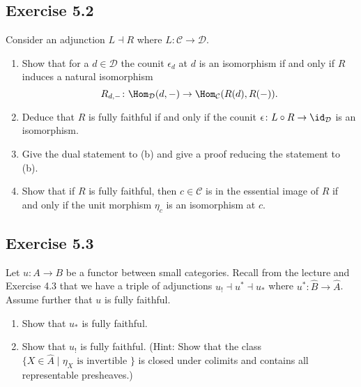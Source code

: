 \subsection{ Exercise 5.2}

Consider an adjunction $ L \dashv R $ where $ L \colon \mathcal{ C } \to \mathcal{ D } $.

\begin{enumerate}[label=(\alph*)]

    \item 
    Show that for a $ d \in \mathcal{ D } $ the counit $ \epsilon_d $ at $ d $ is an isomorphism if and only if $ R $ induces a natural isomorphism 
    \[
        R_{d,-}\colon \Hom_{\mathcal{ D } } ( d, - ) \to \Hom_{ \mathcal{ C } } ( R ( d ) , R ( - ) ). 
    \]

    \item 
    Deduce that $ R $ is fully faithful if and only if the counit $ \epsilon \colon L \circ R  \to \id_{\mathcal{ D } } $ is an isomorphism.

    \item 
    Give the dual statement to (b) and give a proof reducing the statement to (b).

    \item 
    Show that if $ R $ is fully faithful, then $ c \in \mathcal{ C } $ is in the essential image of $ R $ if and only if the unit morphism $ \eta_c $ is an isomorphism at $ c $.
    
\end{enumerate}

\subsection{ Exercise 5.3 }

Let $ u \colon A \to B $ be a functor between small categories.
Recall from the lecture and Exercise 4.3 that we have a triple of adjunctions $ u_! \dashv u^* \dashv u_* $ where $ u^* \colon  \widehat{ B } \to \widehat{ A } $. 
Assume further that $ u $ is fully faithful.

\begin{enumerate}[label=(\alph*)]

    \item 
    Show that $ u_* $ is fully faithful. 

    \item   
    Show that $ u_! $ is fully faithful.
    \newline
    (Hint: Show that the class $ \{ X \in \widehat{ A } \mid \eta_X \text{ is invertible } \} $ is closed under colimits and contains all representable presheaves.)
    
\end{enumerate}

